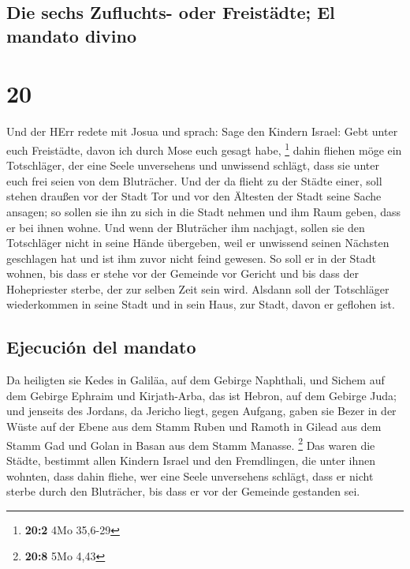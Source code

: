 \hypertarget{die-sechs-zufluchts--oder-freistuxe4dte-el-mandato-divino}{%
\subsection{Die sechs Zufluchts- oder Freistädte; El mandato
divino}\label{die-sechs-zufluchts--oder-freistuxe4dte-el-mandato-divino}}

\hypertarget{section-19}{%
\section{20}\label{section-19}}

 Und der HErr redete mit Josua und sprach: 
Sage den Kindern Israel: Gebt unter euch Freistädte, davon ich durch
Mose euch gesagt habe, \footnote{\textbf{20:2} 4Mo 35,6-29}
 dahin fliehen möge ein Totschläger, der eine Seele
unversehens und unwissend schlägt, dass sie unter euch frei seien von
dem Bluträcher.  Und der da flieht zu der Städte einer,
soll stehen draußen vor der Stadt Tor und vor den Ältesten der Stadt
seine Sache ansagen; so sollen sie ihn zu sich in die Stadt nehmen und
ihm Raum geben, dass er bei ihnen wohne.  Und wenn der
Bluträcher ihm nachjagt, sollen sie den Totschläger nicht in seine Hände
übergeben, weil er unwissend seinen Nächsten geschlagen hat und ist ihm
zuvor nicht feind gewesen.  So soll er in der Stadt
wohnen, bis dass er stehe vor der Gemeinde vor Gericht und bis dass der
Hohepriester sterbe, der zur selben Zeit sein wird. Alsdann soll der
Totschläger wiederkommen in seine Stadt und in sein Haus, zur Stadt,
davon er geflohen ist.

\hypertarget{ejecuciuxf3n-del-mandato}{%
\subsection{Ejecución del mandato}\label{ejecuciuxf3n-del-mandato}}

 Da heiligten sie Kedes in Galiläa, auf dem Gebirge
Naphthali, und Sichem auf dem Gebirge Ephraim und Kirjath-Arba, das ist
Hebron, auf dem Gebirge Juda;  und jenseits des Jordans,
da Jericho liegt, gegen Aufgang, gaben sie Bezer in der Wüste auf der
Ebene aus dem Stamm Ruben und Ramoth in Gilead aus dem Stamm Gad und
Golan in Basan aus dem Stamm Manasse. \footnote{\textbf{20:8} 5Mo 4,43}
 Das waren die Städte, bestimmt allen Kindern Israel und
den Fremdlingen, die unter ihnen wohnten, dass dahin fliehe, wer eine
Seele unversehens schlägt, dass er nicht sterbe durch den Bluträcher,
bis dass er vor der Gemeinde gestanden sei.

